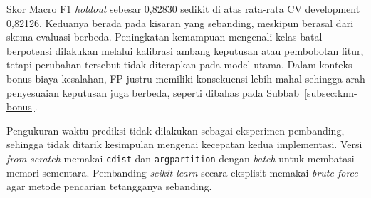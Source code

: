 Skor Macro F1 \textit{holdout} sebesar 0,82830 sedikit di atas rata-rata CV development 0,82126. Keduanya berada pada kisaran yang sebanding, meskipun berasal dari skema evaluasi berbeda. Peningkatan kemampuan mengenali kelas batal berpotensi dilakukan melalui kalibrasi ambang keputusan atau pembobotan fitur, tetapi perubahan tersebut tidak diterapkan pada model utama. Dalam konteks bonus biaya kesalahan, FP justru memiliki konsekuensi lebih mahal sehingga arah penyesuaian keputusan juga berbeda, seperti dibahas pada Subbab~\ref{subsec:knn-bonus}.

Pengukuran waktu prediksi tidak dilakukan sebagai eksperimen pembanding, sehingga tidak ditarik kesimpulan mengenai kecepatan kedua implementasi. Versi \textit{from scratch} memakai \texttt{cdist} dan \texttt{argpartition} dengan \textit{batch} untuk membatasi memori sementara. Pembanding \textit{scikit-learn} secara eksplisit memakai \textit{brute force} agar metode pencarian tetangganya sebanding.